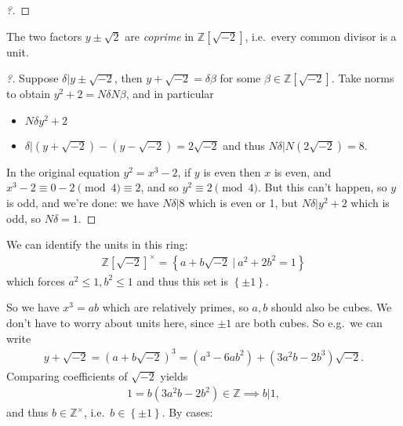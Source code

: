 \begin{example}[Fermat]
\begin{proof}[?]
\end{proof}

\begin{claim}

The two factors \(y \pm \sqrt 2\) are \emph{coprime} in
\({\mathbb{Z}}[\sqrt{-2}]\), i.e.~every common divisor is a unit.

\end{claim}

\begin{proof}[?]

Suppose \(\delta\mathrel{\Big|}y\pm \sqrt{-2}\), then
\(y + \sqrt{-2} = \delta \beta\) for some
\(\beta\in {\mathbb{Z}}[\sqrt{-2}]\). Take norms to obtain
\(y^2 + 2 = N \delta N \beta\), and in particular

\begin{itemize}
\tightlist
\item
  \(N \delta y^2 +2\)
\item
  \(\delta \mathrel{\Big|}(y+ \sqrt{-2} ) - (y - \sqrt{-2} ) = 2 \sqrt{-2}\)
  and thus \(N \delta \mathrel{\Big|}N(2 \sqrt{-2} ) = 8\).
\end{itemize}

In the original equation \(y^2 = x^3-2\), if \(y\) is even then \(x\) is
even, and \(x^3 - 2 \equiv 0-2 \pmod 4 \equiv 2\), and so
\(y^2 \equiv 2 \pmod 4\). But this can't happen, so \(y\) is odd, and
we're done: we have \(N \delta\mathrel{\Big|}8\) which is even or 1, but
\(N \delta\mathrel{\Big|}y^2 +2\) which is odd, so \(N \delta = 1\).

\end{proof}

We can identify the units in this ring:
\begin{align*}
{\mathbb{Z}}[\sqrt{-2} ]^{\times}= \left\{{ a + b \sqrt{-2} {~\mathrel{\Big|}~}a^2 + 2b^2 = 1}\right\}
\end{align*}
which forces \(a^2 \leq 1, b^2 \leq 1\) and thus this set is
\(\left\{{\pm 1}\right\}\).

So we have \(x^3 = ab\) which are relatively primes, so \(a,b\) should
also be cubes. We don't have to worry about units here, since \(\pm 1\)
are both cubes. So e.g.~we can write
\begin{align*}
y + \sqrt{-2} = (a + b \sqrt{-2} )^3 = (a^3-6ab^2) + (3a^2b -2b^3) \sqrt{-2}
.\end{align*}
Comparing coefficients of \(\sqrt{-2}\) yields
\begin{align*} 1 = b(3a^2b - 2b^2) \in {\mathbb{Z}}\implies b \mathrel{\Big|}1
,\end{align*}
and thus \(b\in {\mathbb{Z}}^{\times}\),
i.e.~\(b\in \left\{{\pm 1}\right\}\). By cases:


\end{example}
